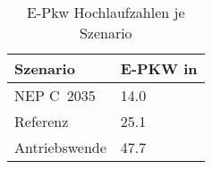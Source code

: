 {
\renewcommand{\arraystretch}{1.2}%
\begin{table}[H]
	\begin{center}
		\caption{E-Pkw Hochlaufzahlen je Szenario}
		\begin{tabu} to 0.55\textwidth {X[1] X[2.1, r]}
			\toprule
			Szenario         & E-PKW in \si{\MioStk}	\\ \midrule
			NEP C~\num{2035} & \num{14.0}               \\
			Referenz         & \num{25.1}               \\
			Antriebswende    & \num{47.7}               \\ \bottomrule
		\end{tabu}
		\label{tab:SzenarienRampUp}
	\end{center}
	\vspace{-3mm}%
\end{table}
}